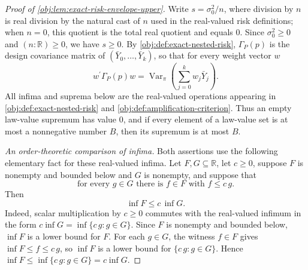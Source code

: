 \begin{proof}[Proof of \cref{obj:lem:exact-risk-envelope-upper}]
Write \(s=\sigma_0^2/n\), where division by \(n\) is real division by the natural cast of \(n\) used in the real-valued risk definitions; when \(n=0\), this quotient is the total real quotient and equals \(0\). Since \(\sigma_0^2\ge0\) and \((n:\mathbb R)\ge0\), we have \(s\ge0\). By \cref{obj:def:exact-nested-risk}, \(\Gamma_P(p)\) is the design covariance matrix of \((\bar Y_0,\ldots,\bar Y_k)\), so that for every weight vector \(w\)
\[
w^\prime\Gamma_P(p)w
=
\operatorname{Var}_\pi\!\left(\sum_{j=0}^k w_j\bar Y_j\right).
\]
All infima and suprema below are the real-valued operations appearing in \cref{obj:def:exact-nested-risk} and \cref{obj:def:amplification-criterion}. Thus an empty law-value supremum has value \(0\), and if every element of a law-value set is at most a nonnegative number \(B\), then its supremum is at most \(B\).

\emph{An order-theoretic comparison of infima.}
Both assertions use the following elementary fact for these real-valued infima. Let \(F,G\subseteq\mathbb R\), let \(c\ge0\), suppose \(F\) is nonempty and bounded below and \(G\) is nonempty, and suppose that
\[
\text{for every }g\in G\text{ there is }f\in F\text{ with } f\le c\,g .
\]
Then
\[
\inf F\le c\,\inf G .
\]
Indeed, scalar multiplication by \(c\ge0\) commutes with the real-valued infimum in the form \(c\inf G=\inf\{c\,g:g\in G\}\). Since \(F\) is nonempty and bounded below, \(\inf F\) is a lower bound for \(F\). For each \(g\in G\), the witness \(f\in F\) gives \(\inf F\le f\le c\,g\), so \(\inf F\) is a lower bound for \(\{c\,g:g\in G\}\). Hence \(\inf F\le\inf\{c\,g:g\in G\}=c\inf G\). %


\end{proof}
